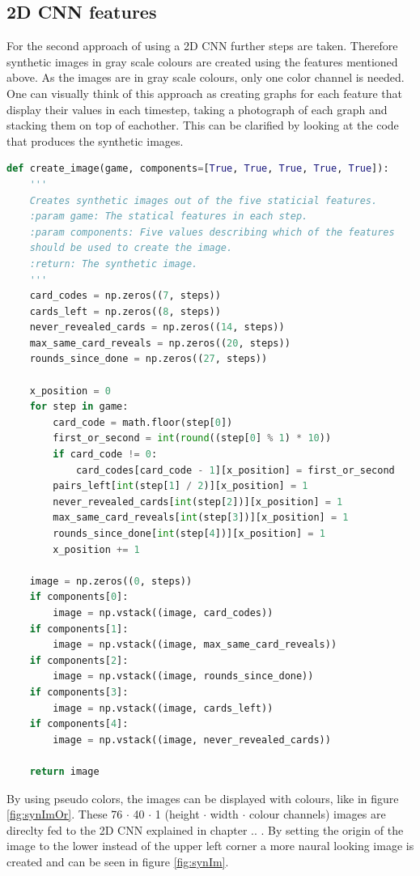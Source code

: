 \subsection{2D CNN features}

For the second approach of using a 2D CNN further steps are taken. Therefore synthetic images in gray scale colours are created using the features mentioned above. As the images are in gray scale colours, only one color channel is needed. One can visually think of this approach as creating graphs for each feature that display their values in each timestep, taking a photograph of each graph and stacking them on top of eachother. This can be clarified by looking at the code that produces the synthetic images.  

\begin{lstlisting}[language=python, caption=Add caption]
def create_image(game, components=[True, True, True, True, True]):
	'''
	Creates synthetic images out of the five staticial features.
	:param game: The statical features in each step. 
	:param components: Five values describing which of the features 
	should be used to create the image. 
	:return: The synthetic image.
	'''
	card_codes = np.zeros((7, steps))
	cards_left = np.zeros((8, steps))
	never_revealed_cards = np.zeros((14, steps))
	max_same_card_reveals = np.zeros((20, steps))
	rounds_since_done = np.zeros((27, steps))
	
	x_position = 0
	for step in game:
		card_code = math.floor(step[0])
		first_or_second = int(round((step[0] % 1) * 10))
		if card_code != 0:
			card_codes[card_code - 1][x_position] = first_or_second 
		pairs_left[int(step[1] / 2)][x_position] = 1
		never_revealed_cards[int(step[2])][x_position] = 1
		max_same_card_reveals[int(step[3])][x_position] = 1
		rounds_since_done[int(step[4])][x_position] = 1
		x_position += 1
	
	image = np.zeros((0, steps))
	if components[0]:   
		image = np.vstack((image, card_codes))
	if components[1]:
		image = np.vstack((image, max_same_card_reveals))
	if components[2]:  
		image = np.vstack((image, rounds_since_done))
	if components[3]:
		image = np.vstack((image, cards_left))
	if components[4]:   
		image = np.vstack((image, never_revealed_cards))
	
	return image
\end{lstlisting}

By using pseudo colors, the images can be displayed with colours, like in figure \ref{fig:synImOr}. These 76 $\cdot$ 40 $\cdot$ 1 (height $\cdot$ width $\cdot$ colour channels) images are direclty fed to the 2D CNN explained in chapter .. . By setting the origin of the image to the lower instead of the upper left corner a more naural looking image is created and can be seen in figure \ref{fig:synIm}. 

